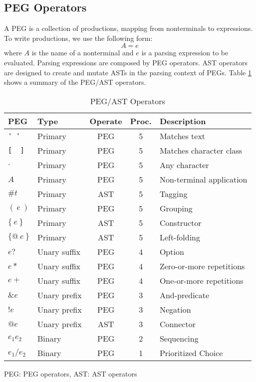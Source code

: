 \documentclass[JIP]{ipsj}
\begin{document}
\subsection{PEG Operators}

A PEG is a collection of productions, mapping from nonterminals to expressions. To write productions, we use the following form:
\[
A = e
\]
\noindent
where $A$ is the name of a nonterminal and $e$ is a parsing expression to be evaluated. Parsing expressions are composed by PEG operators. AST operators are designed to create and mutate ASTs in the parsing context of PEGs. Table \ref{table:peg4d} shows a summary of the PEG/AST operators. 

\begin{table}[bt]
\begin{center}
\caption{PEG/AST Operators} 
\label{table:peg4d}
\begin{tabular}{llccl} \hline
PEG  & Type & Operate & Proc. & Description\\ \hline
\verb|' '| & Primary & PEG & 5 & Matches text\\
\verb|[  ]| & Primary & PEG & 5& Matches character class \\
$.$ & Primary & PEG & 5 & Any character\\
$A$ & Primary & PEG & 5 & Non-terminal application\\
$\#t$ & Primary & AST & 5 & Tagging \\
$(~e~)$ & Primary & PEG & 5 & Grouping\\
$\{~e~\}$ & Primary & AST & 5 & Constructor\\
$\{@~e~\}$ & Primary & AST & 5 & Left-folding\\
$e?$ & Unary suffix & PEG & 4 & Option\\
$e*$ & Unary suffix & PEG & 4 & Zero-or-more repetitions\\
$e+$ & Unary suffix & PEG & 4 & One-or-more repetitions\\
$\&e$ & Unary prefix & PEG & 3 & And-predicate\\
$!e$ & Unary prefix & PEG& 3 & Negation\\
$@e$ & Unary prefix & AST& 3 & Connector \\
$e_1 e_2$ & Binary & PEG& 2 & Sequencing\\
$e_1 / e_2$ & Binary & PEG & 1 & Prioritized Choice\\ \hline
\end{tabular}
PEG: PEG operators, AST: AST operators
\end{center}
\end{table}
\end{document}
